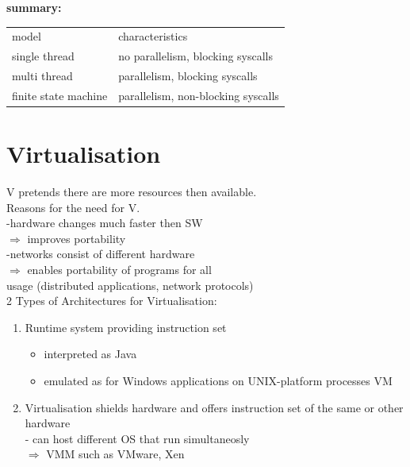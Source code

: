 \documentclass[ngerman,a4paper]{report}
\begin{document}
\textbf{summary:}\\
\begin{tabular}{l l}
model&characteristics\\
single thread& no parallelism, blocking syscalls\\
multi thread& parallelism, blocking syscalls\\
finite state machine& parallelism, non-blocking syscalls\\
\end{tabular}

\section{Virtualisation}

V pretends there are more resources then available.\\

Reasons for the need for V.\\
-hardware changes much faster then SW\\
$\Rightarrow$ improves portability\\
-networks consist of different hardware\\
$\Rightarrow$ enables portability of programs for all\\
usage (distributed applications, network protocols)\\

2 Types of Architectures for Virtualisation:\\
\begin{enumerate}
\item Runtime system providing instruction set\\
	\begin{itemize}
	\item interpreted as Java
	\item emulated as for Windows applications on UNIX-platform processes VM
	\end{itemize}
\item Virtualisation shields hardware and offers instruction set of the same or other hardware\\
- can host different OS that run simultaneosly\\
$\Rightarrow$ VMM such as VMware, Xen\\


\end{enumerate}
\end{document}
